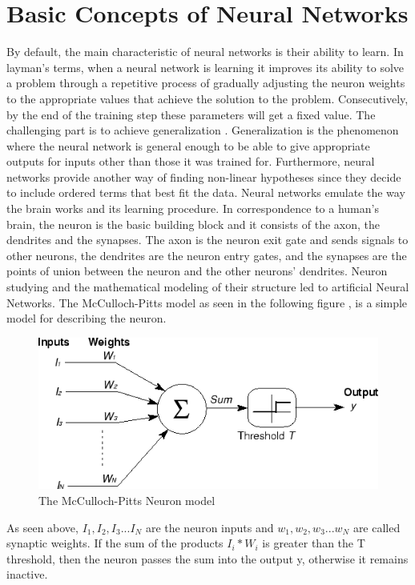 \section{Basic Concepts of Neural Networks}
By default, the main characteristic of neural networks is their ability to learn. In layman’s terms, when a neural network is learning it improves its ability to solve a problem through a repetitive process of gradually adjusting the neuron weights to the appropriate values that achieve the solution to the problem. Consecutively, by the end of the training step these parameters will get a fixed value. The challenging part is to achieve generalization \cite{liu2018r}. Generalization is the phenomenon where the neural network is general enough to be able to give appropriate outputs for inputs other than those it was trained for. Furthermore, neural networks provide another way of finding non-linear hypotheses since they decide to include ordered terms that best fit the data.
Neural networks emulate the way the brain works and its learning procedure. In correspondence to a human’s brain, the neuron is the basic building block and it consists of the axon, the dendrites and the synapses. The axon is the neuron exit gate and sends signals to other neurons, the dendrites are the neuron entry gates, and the synapses are the points of union between the neuron and the other neurons' dendrites. Neuron studying and the mathematical modeling of their structure led to artificial Neural Networks. The McCulloch-Pitts model as seen in the following figure \cite{chakrabortyoptimized}, is a simple model for describing the neuron.
\begin{figure}[ht!]
\centering
\includegraphics[width=0.6\linewidth]{project/Pitts.png}

\caption{The McCulloch-Pitts Neuron model}
\end{figure}
\par As seen above, $I_1, I_2, I_3 ...I_N$ are the neuron inputs and $w_1, w_2, w_3...w_N$ are called synaptic weights. If the sum of the products $I_i*W_i$ is greater than the T threshold, then the neuron passes the sum into the output y, otherwise it remains inactive. 
